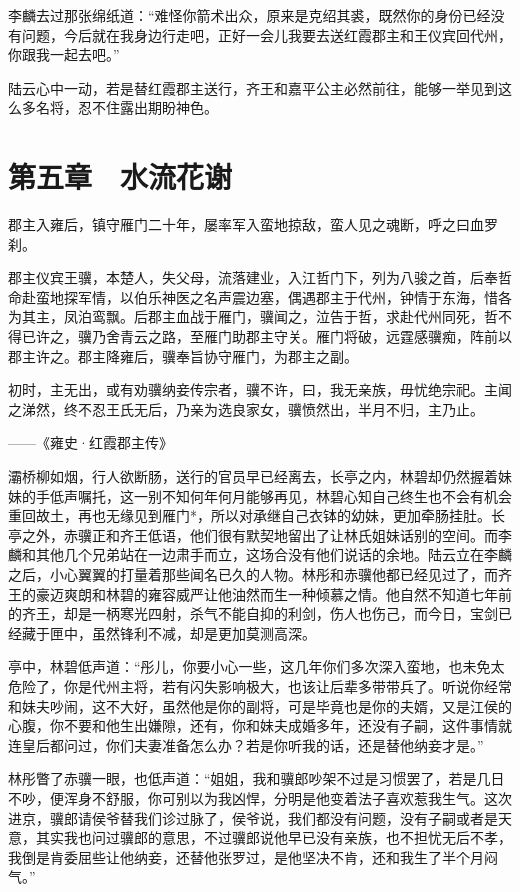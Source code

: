 李麟去过那张绵纸道：“难怪你箭术出众，原来是克绍其裘，既然你的身份已经没有问题，今后就在我身边行走吧，正好一会儿我要去送红霞郡主和王仪宾回代州，你跟我一起去吧。”

陆云心中一动，若是替红霞郡主送行，齐王和嘉平公主必然前往，能够一举见到这么多名将，忍不住露出期盼神色。

\chapter{第五章　水流花谢}

郡主入雍后，镇守雁门二十年，屡率军入蛮地掠敌，蛮人见之魂断，呼之曰血罗刹。

郡主仪宾王骥，本楚人，失父母，流落建业，入江哲门下，列为八骏之首，后奉哲命赴蛮地探军情，以伯乐神医之名声震边塞，偶遇郡主于代州，钟情于东海，惜各为其主，凤泊鸾飘。后郡主血战于雁门，骥闻之，泣告于哲，求赴代州同死，哲不得已许之，骥乃舍青云之路，至雁门助郡主守关。雁门将破，远霆感骥痴，阵前以郡主许之。郡主降雍后，骥奉旨协守雁门，为郡主之副。

初时，主无出，或有劝骥纳妾传宗者，骥不许，曰，我无亲族，毋忧绝宗祀。主闻之涕然，终不忍王氏无后，乃亲为选良家女，骥愤然出，半月不归，主乃止。

——《雍史·红霞郡主传》

灞桥柳如烟，行人欲断肠，送行的官员早已经离去，长亭之内，林碧却仍然握着妹妹的手低声嘱托，这一别不知何年何月能够再见，林碧心知自己终生也不会有机会重回故土，再也无缘见到雁门*，所以对承继自己衣钵的幼妹，更加牵肠挂肚。长亭之外，赤骥正和齐王低语，他们很有默契地留出了让林氏姐妹话别的空间。而李麟和其他几个兄弟站在一边肃手而立，这场合没有他们说话的余地。陆云立在李麟之后，小心翼翼的打量着那些闻名已久的人物。林彤和赤骥他都已经见过了，而齐王的豪迈爽朗和林碧的雍容威严让他油然而生一种倾慕之情。他自然不知道七年前的齐王，却是一柄寒光四射，杀气不能自抑的利剑，伤人也伤己，而今日，宝剑已经藏于匣中，虽然锋利不减，却是更加莫测高深。

亭中，林碧低声道：“彤儿，你要小心一些，这几年你们多次深入蛮地，也未免太危险了，你是代州主将，若有闪失影响极大，也该让后辈多带带兵了。听说你经常和妹夫吵闹，这不大好，虽然他是你的副将，可是毕竟也是你的夫婿，又是江侯的心腹，你不要和他生出嫌隙，还有，你和妹夫成婚多年，还没有子嗣，这件事情就连皇后都问过，你们夫妻准备怎么办？若是你听我的话，还是替他纳妾才是。”

林彤瞥了赤骥一眼，也低声道：“姐姐，我和骥郎吵架不过是习惯罢了，若是几日不吵，便浑身不舒服，你可别以为我凶悍，分明是他变着法子喜欢惹我生气。这次进京，骥郎请侯爷替我们诊过脉了，侯爷说，我们都没有问题，没有子嗣或者是天意，其实我也问过骥郎的意思，不过骥郎说他早已没有亲族，也不担忧无后不孝，我倒是肯委屈些让他纳妾，还替他张罗过，是他坚决不肯，还和我生了半个月闷气。”

